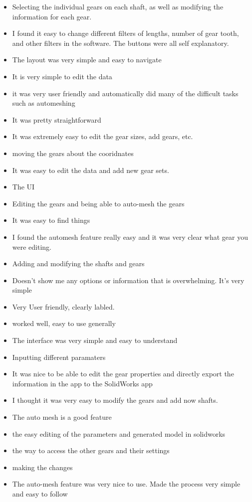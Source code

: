 \begin{itemize}
\item Selecting the individual gears on each shaft, as well as modifying the information for each gear.
\item I found it easy to change different filters of lengths, number of gear tooth, and other filters in the software. The buttons were all self explanatory. 
\item The layout was very simple and easy to navigate
\item It is very simple to edit the data
\item it was very user friendly and automatically did many of the difficult tasks such as automeshing
\item It was pretty straightforward
\item It was extremely easy to edit the gear sizes, add gears, etc. 
\item moving the gears about the cooridnates
\item It was easy to edit the data and add new gear sets.
\item The UI
\item Editing the gears and being able to auto-mesh the gears
\item It was easy to find things
\item I found the automesh feature really easy and it was very clear what gear you were editing.
\item Adding and modifying the shafts and gears
\item Doesn't show me any options or information that is overwhelming. It's very simple
\item Very User friendly, clearly labled.
\item worked well, easy to use generally
\item The interface was very simple and easy to understand
\item Inputting different paramaters
\item It was nice to be able to edit the gear properties and directly export the information in the app to the SolidWorks app
\item I thought it was very easy to modify the gears and add now shafts.
\item The auto mesh is a good feature
\item the easy editing of the parameters and generated model in solidworks 
\item the way to access the other gears and their settings
\item making the changes
\item The auto-mesh feature was very nice to use. Made the process very simple and easy to follow

\end{itemize}
